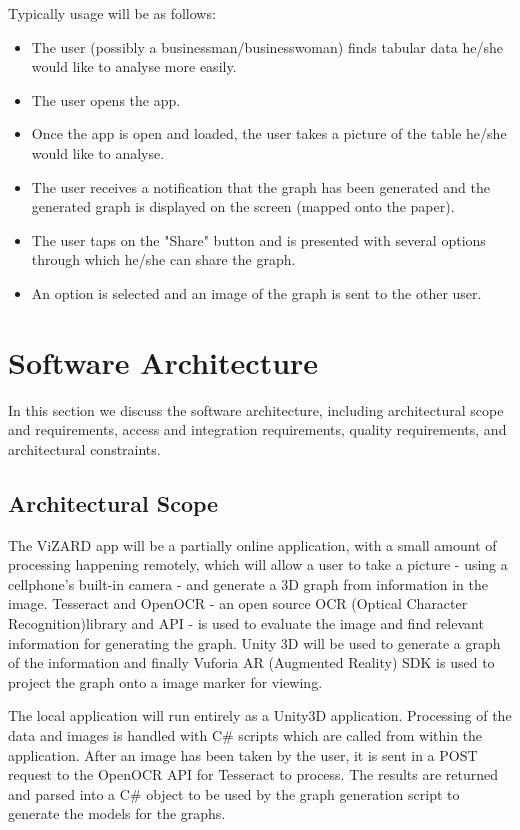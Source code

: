 \documentclass[a4paper,12pt]{article}
\begin{document}
Typically usage will be as follows:
\begin{itemize}
	\item The user (possibly a businessman/businesswoman) finds tabular data he/she would like to analyse more easily.
	\item The user opens the app.
	\item Once the app is open and loaded, the user takes a picture of the table he/she would like to analyse.
	\item The user receives a notification that the graph has been generated and the generated graph is displayed on the screen (mapped onto the paper).
	\item The user taps on the "Share" button and is presented with several options through which he/she can share the graph.
	\item An option is selected and an image of the graph is sent to the other user.
\end{itemize}

\newpage
\section{Software Architecture}
In this section we discuss the software architecture, including architectural scope and requirements, access and integration requirements, quality requirements, and architectural constraints.

\subsection{Architectural Scope}
The ViZARD app will be a partially online application, with a small amount of processing happening remotely, which will allow a user to take a picture - using a cellphone's built-in camera - and generate a 3D graph from information in the image. Tesseract and OpenOCR - an open source OCR (Optical Character Recognition)library and API - is used to evaluate the image and find relevant information for generating the graph. 
Unity 3D will be used to generate a graph of the information and finally Vuforia AR (Augmented Reality) SDK is used to project the graph onto a image marker for viewing.

The local application will run entirely as a Unity3D application. Processing of the data and images is handled with C\# scripts which are called from within the application. After an image has been taken by the user, it is sent in a POST request to the OpenOCR API for Tesseract to process. The results are returned and parsed into a C\# object to be used by the graph generation script to generate the models for the graphs.
\end{document}
